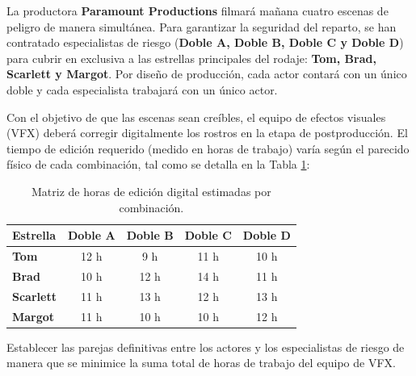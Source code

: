 La productora \textbf{Paramount Productions} filmará mañana cuatro escenas de peligro de manera simultánea. Para garantizar la seguridad del reparto, se han contratado especialistas de riesgo (\textbf{Doble A, Doble B, Doble C y Doble D}) para cubrir en exclusiva a las  estrellas principales del rodaje: \textbf{Tom, Brad, Scarlett y Margot}. Por diseño de producción, cada actor contará con un único doble y cada especialista trabajará con un único actor.

Con el objetivo de que las escenas sean creíbles, el equipo de efectos visuales (VFX) deberá corregir digitalmente los rostros en la etapa de postproducción. El tiempo de edición requerido (medido en horas de trabajo) varía según el parecido físico de cada combinación, tal como se detalla en la Tabla \ref{tab:paramount}:

\begin{table}[htbp]
\centering
\caption{Matriz de horas de edición digital estimadas por combinación.}
\label{tab:paramount}
\begin{tabular}{lcccc}
\toprule
\textbf{Estrella} & \textbf{Doble A} & \textbf{Doble B} & \textbf{Doble C} & \textbf{Doble D} \\
\midrule
\textbf{Tom}      & 12 h & 9 h  & 11 h & 10 h \\
\textbf{Brad}     & 10 h & 12 h & 14 h & 11 h \\
\textbf{Scarlett} & 11 h & 13 h & 12 h & 13 h \\
\textbf{Margot}   & 11 h & 10 h & 10 h & 12 h \\
\bottomrule
\end{tabular}
\end{table}

Establecer las parejas definitivas entre los actores y los especialistas de riesgo de manera que se minimice la suma total de horas de trabajo del equipo de VFX.
